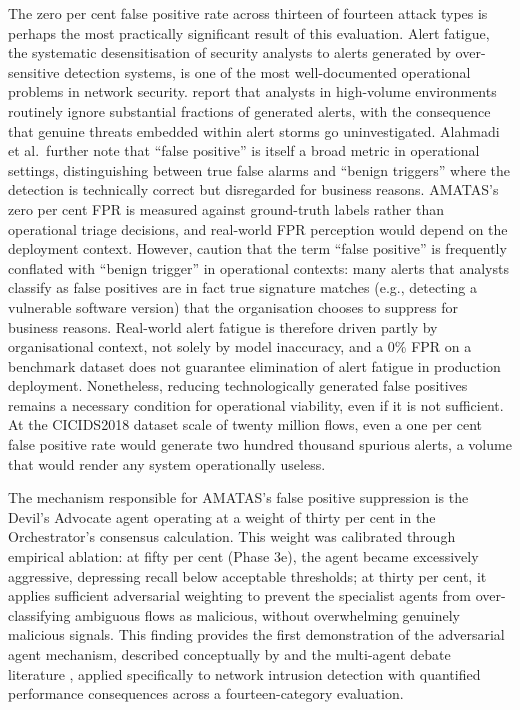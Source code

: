 \documentclass[../main.tex]{subfiles}
\begin{document}
The zero per cent false positive rate across thirteen of fourteen attack types is perhaps the most practically significant result of this evaluation. Alert fatigue, the systematic desensitisation of security analysts to alerts generated by over-sensitive detection systems, is one of the most well-documented operational problems in network security. \textcite{Alahmadi2020} report that analysts in high-volume environments routinely ignore substantial fractions of generated alerts, with the consequence that genuine threats embedded within alert storms go uninvestigated. Alahmadi et al.\ further note that ``false positive'' is itself a broad metric in operational settings, distinguishing between true false alarms and ``benign triggers'' where the detection is technically correct but disregarded for business reasons. AMATAS's zero per cent FPR is measured against ground-truth labels rather than operational triage decisions, and real-world FPR perception would depend on the deployment context. However, \textcite{Alahmadi2020} caution that the term ``false positive'' is frequently conflated with ``benign trigger'' in operational contexts: many alerts that analysts classify as false positives are in fact true signature matches (e.g., detecting a vulnerable software version) that the organisation chooses to suppress for business reasons. Real-world alert fatigue is therefore driven partly by organisational context, not solely by model inaccuracy, and a 0\% FPR on a benchmark dataset does not guarantee elimination of alert fatigue in production deployment. Nonetheless, reducing technologically generated false positives remains a necessary condition for operational viability, even if it is not sufficient. At the CICIDS2018 dataset scale of twenty million flows, even a one per cent false positive rate would generate two hundred thousand spurious alerts, a volume that would render any system operationally useless.

The mechanism responsible for AMATAS's false positive suppression is the Devil's Advocate agent operating at a weight of thirty per cent in the Orchestrator's consensus calculation. This weight was calibrated through empirical ablation: at fifty per cent (Phase 3e), the agent became excessively aggressive, depressing recall below acceptable thresholds; at thirty per cent, it applies sufficient adversarial weighting to prevent the specialist agents from over-classifying ambiguous flows as malicious, without overwhelming genuinely malicious signals. This finding provides the first demonstration of the adversarial agent mechanism, described conceptually by \textcite{Yin2024} and the multi-agent debate literature \autocite{Du2023, Chan2023}, applied specifically to network intrusion detection with quantified performance consequences across a fourteen-category evaluation.
\end{document}
